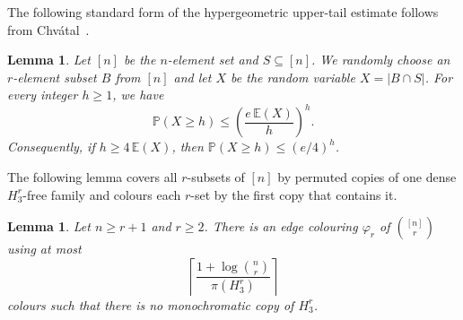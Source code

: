 \documentclass[10pt,a4paper]{amsart}
\numberwithin{equation}{section}
\newtheorem{lemma}[theorem]{Lemma}
\begin{document}
The following standard form of the hypergeometric upper-tail estimate follows from Chv\'atal~\cite{Chvatal1979}.

\begin{lemma}\label{end:lem:hypergeom}
Let $[n]$ be the $n$-element set and $S\subseteq [n]$.  We randomly choose an $r$-element subset $B$ from $[n]$ and let $X$ be the random variable $X=|B\cap S|$.
For every integer $h\ge1$, we have
$$\mathbb{P}(X\ge h)\le \left(\frac{e \,\mathbb{E}(X)}{h}\right)^h.$$
Consequently, if $h\ge4 \,\mathbb{E}(X)$, then $\mathbb{P}(X\ge h)\le(e/4)^h$.
\end{lemma}



The following lemma covers all $r$-subsets of $[n]$ by permuted copies of one dense $H_3^r$-free 
family and colours each $r$-set by the first copy that contains it.

\begin{lemma}\label{end:lem:local-colour}
Let $n\ge r+1$ and $r\ge2$.  There is an edge colouring $\varphi_r$ of
$\binom{[n]}{r}$ using at most
$$ \left\lceil\frac{1+\log\binom nr}{\pi(H_3^r)}\right\rceil$$
colours such that there is no monochromatic copy of $H_3^r$.


\end{lemma}
\end{document}
